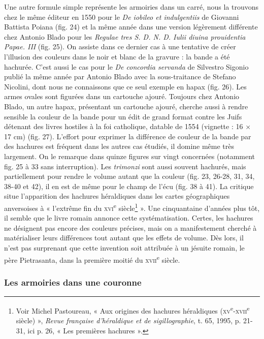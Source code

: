 \documentclass[12pt,twoside,openany]{book}
\begin{document}
Une autre formule simple représente les armoiries dans un carré, nous la trouvons chez le même éditeur en 1550 pour le \textit{De iobileo et indulgentiis} de Giovanni Battista Poiana (fig. 24) et la même année dans une version légèrement différente chez Antonio Blado pour les \textit{Regulae tres S. D. N. D. Iulii diuina prouidentia Papae. III }(fig. 25). On assiste dans ce dernier cas à une tentative de créer l’illusion des couleurs dans le noir et blanc de la gravure : la bande a été hachurée. C’est aussi le cas pour le \textit{De concordia servanda} de Silvestro Sigonio publié la même année par Antonio Blado avec la sous-traitance de Stefano Nicolini, dont nous ne connaissons que ce seul exemple en hapax (fig. 26). Les armes ovales sont figurées dans un cartouche ajouré. Toujours chez Antonio Blado, un autre hapax, présentant un cartouche ajouré, cherche aussi à rendre sensible la couleur de la bande pour un édit de grand format contre les Juifs détenant des livres hostiles à la foi catholique, datable de 1554 (vignette : 16 × 17 cm) (fig. 27). L’effort pour exprimer la différence de couleur de la bande par des hachures est fréquent dans les autres cas étudiés, il domine même très largement. On le remarque dans quinze figures sur vingt concernées (notamment fig. 25 à 33 sans interruption). Les \textit{trimonzi} sont aussi souvent hachurés, mais partiellement pour rendre le volume autant que la couleur (fig. 23, 26-28, 31, 34, 38-40 et 42), il en est de même pour le champ de l’écu (fig. 38 à 41). La critique situe l’apparition des hachures héraldiques dans les cartes géographiques anversoises à « l’extrême fin du \textsc{xvi}\textsuperscript{e} siècle\footnote{Voir Michel Pastoureau, « Aux origines des hachures héraldiques (\textsc{xv}\textsuperscript{e}-\textsc{xvii}\textsuperscript{e} siècle) », \textit{Revue française d’héraldique et de sigillographie}, t. 65, 1995, p. 21-31, ici p. 26, « Les premières hachures ».} ». Une cinquantaine d’années plus tôt, il semble que le livre romain annonce cette systématisation. Certes, les hachures ne désignent pas encore des couleurs précises, mais on a manifestement cherché à matérialiser leurs différences tout autant que les effets de volume. Dès lors, il n’est pas surprenant que cette invention soit attribuée à un jésuite romain, le père Pietrasanta, dans la première moitié du \textsc{xvii}\textsuperscript{e} siècle.

\subsubsection{Les armoiries dans une couronne}
\end{document}
